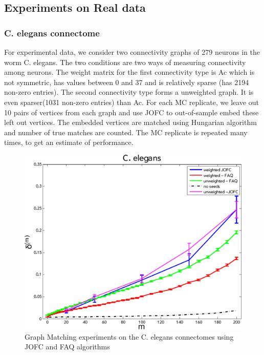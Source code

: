 \documentclass[12pt,oneside,final]{thesis}\usepackage[]{graphicx}\usepackage[]{color}
\begin{document}
\subsection{Experiments on Real data}

\subsubsection{C. elegans connectome}
For experimental data, we consider two connectivity graphs of 279 neurons in the  worm C. elegans. The two conditions are two ways of measuring connectivity among neurons. The  weight matrix for the first connectivity type is Ac which is not symmetric, has values between 0 and 37 and is relatively sparse (has 2194 non-zero entries). The second connectivity type forms a unweighted graph. It is even sparser(1031 non-zero entries) than Ac. For each MC replicate, we leave out 10 pairs of vertices from each graph and use JOFC to out-of-sample embed these left out vertices. The embedded vertices are matched using Hungarian algorithm and number of true matches are counted. The MC replicate is repeated many times, to get an estimate of performance. 
\begin{figure}
\includegraphics[scale=0.75]{worm_jofc_vs_faq_wt_unwt-crop}
\caption{Graph Matching experiments on the C. elegans connectomes using JOFC and FAQ algorithms \label{worm_graphmatch}}
\end{figure}
\end{document}
